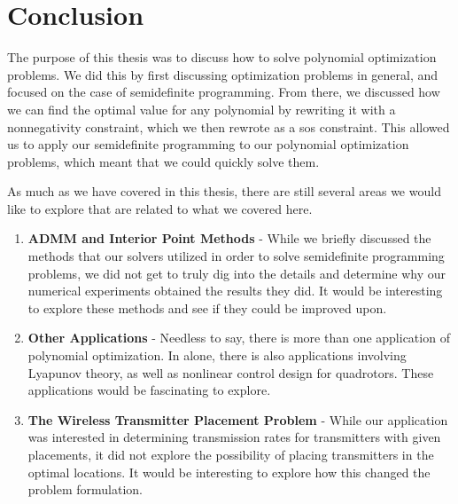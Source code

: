 
\chapter{Conclusion}

The purpose of this thesis was to discuss how to solve polynomial optimization problems. We did this by first discussing optimization problems in general, and focused on the case of semidefinite programming. From there, we discussed how we can find the optimal value for any polynomial by rewriting it with a nonnegativity constraint, which we then rewrote as a sos constraint. This allowed us to apply our semidefinite programming to our polynomial optimization problems, which meant that we could quickly solve them.

As much as we have covered in this thesis, there are still several areas we would like to explore that are related to what we covered here.

\begin{enumerate}
	\item \textbf{ADMM and Interior Point Methods} - While we briefly discussed the methods that our solvers utilized in order to solve semidefinite programming problems, we did not get to truly dig into the details and determine why our numerical experiments obtained the results they did. It would be interesting to explore these methods and see if they could be improved upon. 
	
	\item \textbf{Other Applications} - Needless to say, there is more than one application of polynomial optimization. In \cite{Ahmadi2016a} alone, there is also applications involving Lyapunov theory, as well as nonlinear control design for quadrotors. These applications would be fascinating to explore. 
	
	\item \textbf{The Wireless Transmitter Placement Problem} - While our application was interested in determining transmission rates for transmitters with given placements, it did not explore the possibility of placing transmitters in the optimal locations. It would be interesting to explore how this changed the problem formulation. 
\end{enumerate}